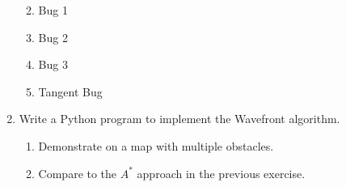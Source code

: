 \begin{enumerate}
  \begin{enumerate}
  \def\labelenumii{\alph{enumii}.}
  \tightlist
  \item
    Bug 1
  \item
    Bug 2
  \item
    Bug 3
  \item
    Tangent Bug
  \end{enumerate}
\item
  Write a Python program to implement the Wavefront algorithm.

  \begin{enumerate}
  \tightlist
  \item
    Demonstrate on a map with multiple obstacles.
  \item
    Compare to the \(A^*\) approach in the previous exercise.
  \end{enumerate}
\end{enumerate}
